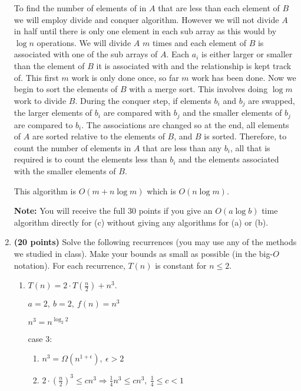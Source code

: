 \documentclass[11pt]{article}
\begin{document}
\begin{enumerate}
To find the number of elements of in $A$ that are less than each element of $B$ we will employ divide and conquer algorithm. However we will not divide $A$ in half until there is only one element in each sub array as this would by $\log n$ operations. We will divide $A$ $m$ times and each element of $B$ is associated with one of the sub arrays of $A$. Each $a_i$ is either larger or smaller than the element of $B$ it is associated with and the relationship is kept track of. This first $m$ work is only done once, so far $m$ work has been done. Now we begin to sort the elements of $B$ with a merge sort. This involves doing $\log m$ work to divide $B$. During the conquer step, if elements $b_i$ and $b_j$ are swapped, the larger elements of $b_i$ are compared with $b_j$ and the smaller elements of $b_j$ are compared to $b_i$. The associations are changed so at the end, all elements of $A$ are sorted relative to the elements of $B$, and $B$ is sorted. Therefore, to count the number of elements in $A$ that are less than any $b_i$, all that is required is to count the elements less than $b_i$ and the elements associated with the smaller elements of $B$.

This algorithm is $O(m+n\log m)$ which is $O(n\log m)$.

{\bf Note:}
You will receive the full 30 points if you give an $O(a\log b)$ time algorithm directly for (c) without giving any algorithms for (a) or (b).


\item %
{\bf (20 points)}
Solve the following recurrences (you may use any of the methods we studied in class). Make your bounds as small as possible (in the big-$O$ notation). For each recurrence, $T(n)$ is constant for $n\leq 2$.

\begin{enumerate}
\item
$T(n)=2\cdot T(\frac{n}{2})+ n^3$.

$a=2,\ b=2,\ f(n)=n^3$

$n^3 = n^{\log_2{2}}$


case 3:
\begin{enumerate}

  \item
    $n^3 = \Omega(n^{1+\epsilon}),\ \epsilon > 2$

  \item
    $2\cdot\left(\frac{n}{2}\right)^3 \leq cn^3\Rightarrow \frac{1}{4}n^3\leq cn^3 ,\ \frac{1}{4}\leq c < 1 $

\end{enumerate}


\end{enumerate}
\end{enumerate}
\end{document}
